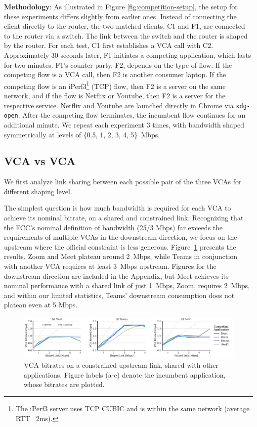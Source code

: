 \noindent \textbf{Methodology}: As illustrated in Figure \ref{fig:competition-setup}, the setup for these experiments differs slightly from earlier ones. 
Instead of connecting the client directly to the router, the two matched clients, C1 and F1, are connected to the router via a switch. 
The link between the switch and the router is shaped by the router. For each test, C1 first establishes a VCA call with C2.
Approximately 30 seconds later, F1 initiates a competing application, which lasts for two minutes.
F1's counter-party, F2, depends on the type of flow.
If the competing flow is a VCA call, then F2 is another consumer laptop.
If the competing flow is an iPerf3\footnote{The iPerf3 server uses TCP CUBIC and is  within the same network (average RTT ~2ms).} (TCP) flow, then F2 is a server on the same network,
  and if the flow is Netflix or Youtube, then F2 is a server for the respective service. Netflix and Youtube are launched directly in Chrome via \texttt{xdg-open}.
After the competing flow terminates, the incumbent flow continues for an additional minute.
We repeat each experiment 3 times, with bandwidth shaped symmetrically at levels of \{0.5, 1, 2, 3, 4, 5\}~Mbps.

\subsection{VCA vs VCA}



We first analyze link sharing between each possible pair of the three VCAs for different shaping level.  

The simplest question is how much bandwidth is required for each VCA to achieve its nominal bitrate, on a shared and constrained link.  Recognizing that the FCC's nominal definition of bandwidth (25/3 Mbps) far exceeds the requirements of multiple VCAs in the downstream direction, we focus on the upstream where the official constraint is less generous.  Figure~\ref{fig:comp_ul} presents the results.  Zoom and Meet plateau around 2~Mbps, while Teams in conjunction with another VCA requires at least 3~Mbps upstream.  Figures for the downstream direction are included in the Appendix, but Meet achieves its nominal performance with a shared link of just 1~Mbps, Zoom, requires 2~Mbps, and within our limited statistics, Teams' downstream consumption does not plateau even at 5 Mbps.

\begin{figure}
    \centering
    \includegraphics[width=\linewidth]{figures/comp/ul_competition_all.pdf}
    \caption{VCA bitrates on a constrained upstream link, shared with other applications.  Figure labels (a-c) denote the incumbent application, whose bitrates are plotted.}
    \label{fig:comp_ul}
\end{figure}

